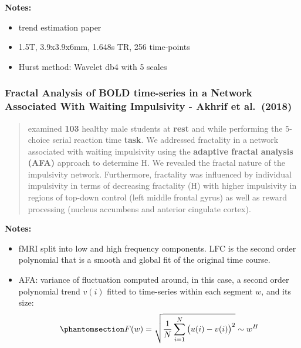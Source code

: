 \documentclass[
  sn-vancouver,
  Numbered,
  referee,
  lineno]{sn-jnl}
\providecommand{\tightlist}{%
  \setlength{\itemsep}{0pt}\setlength{\parskip}{0pt}}\usepackage{longtable,booktabs,array}
\begin{document}
\textbf{Notes:}

\begin{itemize}
\tightlist
\item
  trend estimation paper
\item
  1.5T, 3.9x3.9x6mm, 1.648s TR, 256 time-points
\item
  Hurst method: Wavelet db4 with 5 scales
\end{itemize}

\subsubsection{\texorpdfstring{Fractal Analysis of BOLD time-series in a
Network Associated With Waiting Impulsivity - Akhrif et al.~(2018)
\citep{akhrifFractalAnalysisBOLD2018}}{Fractal Analysis of BOLD time-series in a Network Associated With Waiting Impulsivity - Akhrif et al.~(2018) {[}@akhrifFractalAnalysisBOLD2018{]}}}\label{fractal-analysis-of-bold-time-series-in-a-network-associated-with-waiting-impulsivity---akhrif-et-al.-2018-akhriffractalanalysisbold2018-2}

\begin{quote}
examined \textbf{103 } healthy male students at \textbf{rest} and while
performing the 5-choice serial reaction time \textbf{task}. We addressed
fractality in a network associated with waiting impulsivity using the
\textbf{adaptive fractal analysis (AFA)} approach to determine H. We
revealed the fractal nature of the impulsivity network. Furthermore,
fractality was influenced by individual impulsivity in terms of
decreasing fractality (H) with higher impulsivity in regions of top-down
control (left middle frontal gyrus) as well as reward processing
(nucleus accumbens and anterior cingulate cortex).
\end{quote}

\textbf{Notes:}

\begin{itemize}
\tightlist
\item
  fMRI split into low and high frequency components. LFC is the second
  order polynomial that is a smooth and global fit of the original time
  course.
\item
  AFA: variance of fluctuation computed around, in this case, a second
  order polynomial trend \(v(i)\) fitted to time-series within each
  segment \(w\), and its size:
  \begin{equation}\phantomsection\label{eq-AFA}{
  F(w) = \sqrt{\frac{1}{N} \sum_{i=1}^{N} \big(u(i) - v(i)\big)^2} \sim w^H
  }\end{equation}
\end{itemize}
\end{document}
